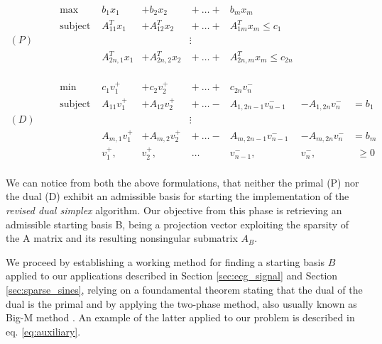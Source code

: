 \documentclass[journal,article,submit,electronics,pdftex]{Definitions/mdpi}
\begin{document}
{\begin{equation*}
\begin{array}{llllclll}
& \text{max}         & b_1 x_1  & + b_2 x_2   & {}+{\dots}+{} & b_m x_m  \\
& \text{subject to } & A_{11}^Tx_1 & + A_{12}^Tx_2 & {}+{\dots}+{} & A_{1m}^Tx_m \leq c_1\\
(P)\hspace{20pt}&             &             &               &\vdots         &\\
& & A_{2n,1}^Tx_1 & + A_{2n,2}^Tx_2 & {}+{\dots}+{} & A_{2n,m}^Tx_m \leq c_{2n}\\
\\\\\\
& \text{min}         & c_1 v_1^+  & + c_2 v_2^+   & {}+{\dots}+{} & c_{2n} v_{n}^-  \\
& \text{subject to } & A_{11}v_1^+ & + A_{12}v_2^+ & {}+{\dots}-{} & A_{1,2n-1}v_{n-1}^- & - A_{1,2n}v_n^- & {} = b_1 \\
(D)\hspace{20pt}&             &             &               &\vdots         &                    &             &          \\
 &  & A_{m,1}v_1^+ & + A_{m,2}v_2^+ & {}+{\dots}-{} & A_{m, 2n-1}v_{n-1}^- & -A_{m, 2n}v_{n}^- & {} = b_{m} \\
 &  & v_1^+,  & v_2^+,  & {}\:{\dots}\:{}  & v_{n-1}^-,  & v_{n}^-,  & \:\:\geq{0}  \\
\end{array}
\end{equation*}

We can notice from both the above formulations, that neither the primal (P) nor the dual (D) exhibit an admissible basis for starting the implementation of the \emph{revised dual simplex} algorithm. Our objective from this phase is retrieving an admissible starting basis B, being a projection vector exploiting the sparsity of the A matrix and its resulting nonsingular submatrix $A_B$.

We proceed by establishing a working method for finding a starting basis $B$ applied to our applications described in Section \ref{sec:ecg_signal} and Section \ref{sec:sparse_sines}, relying on a foundamental theorem stating that the dual of the dual is the primal and by applying the two-phase method, also usually known as Big-M method \cite{bigMmethod}. An example of the latter applied to our problem is described in eq. \ref{eq:auxiliary}. 

}
\end{document}
